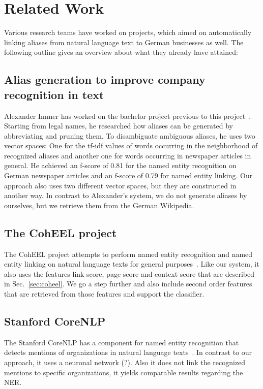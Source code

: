 \section{Related Work}
\label{sec:related_work}
Various research teams have worked on projects, which aimed on automatically linking aliases from natural language text to German businesses as well. The following outline gives an overview about what they already have attained:

\subsection{Alias generation to improve company recognition in text}
Alexander Immer has worked on the bachelor project previous to this project~\cite{Alexander}. Starting from legal names, he researched how aliases can be generated by abbreviating and pruning them. To disambiguate ambiguous aliases, he uses two vector spaces: One for the tf-idf values of words occurring in the neighborhood of recognized aliases and another one for words occurring in newspaper articles in general. He achieved an f-score of 0.81 for the named entity recognition on German newspaper articles and an f-score of 0.79 for named entity linking. Our approach also uses two different vector spaces, but they are constructed in another way. In contrast to Alexander's system, we do not generate aliases by ourselves, but we retrieve them from the German Wikipedia.

\subsection{The CohEEL project}
The CohEEL project attempts to perform named entity recognition and named entity linking on natural language texts for general purposes~\cite{CohEEL}. Like our system, it also uses the features link score, page score and context score that are described in Sec.~\ref{sec:coheel}. We go a step further and also include second order features that are retrieved from those features and support the classifier.

\subsection{Stanford CoreNLP}
The Stanford CoreNLP has a component for named entity recognition that detects mentions of organizations in natural language texts~\cite{Stanford}. In contrast to our approach, it uses a neuronal network (?). Also it does not link the recognized mentions to specific organizations, it yields comparable results regarding the NER.
